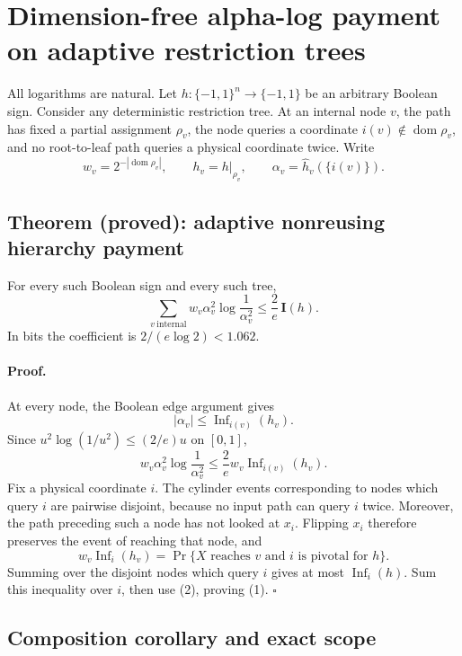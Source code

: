 \section*{Dimension-free alpha-log payment on adaptive restriction trees}

All logarithms are natural.  Let \(h:\{-1,1\}^n\to\{-1,1\}\) be an
arbitrary Boolean sign.  Consider any deterministic restriction tree.
At an internal node \(v\), the path has fixed a partial assignment
\(\rho_v\), the node queries a coordinate \(i(v)\notin\operatorname{dom}\rho_v\),
and no root-to-leaf path queries a physical coordinate twice.  Write
\[
 w_v=2^{-|\operatorname{dom}\rho_v|},\qquad
 h_v=h\vert_{\rho_v},\qquad
 \alpha_v=\widehat h_v(\{i(v)\}).
\]

\subsection*{Theorem (proved): adaptive nonreusing hierarchy payment}

For every such Boolean sign and every such tree,
\[
 \boxed{
 \sum_{v\ \mathrm{internal}}w_v\alpha_v^2
       \log\frac1{\alpha_v^2}
 \le\frac2e\,\mathbf I(h).}                                      \tag{1}
\]
In bits the coefficient is \(2/(e\log2)<1.062\).

\paragraph{Proof.}
At every node, the Boolean edge argument gives
\[
 |\alpha_v|\le\operatorname{Inf}_{i(v)}(h_v).
\]
Since \(u^2\log(1/u^2)\le(2/e)u\) on \([0,1]\),
\[
 w_v\alpha_v^2\log\frac1{\alpha_v^2}
 \le\frac2e w_v\operatorname{Inf}_{i(v)}(h_v).                    \tag{2}
\]
Fix a physical coordinate \(i\).  The cylinder events corresponding to
nodes which query \(i\) are pairwise disjoint, because no input path can
query \(i\) twice.  Moreover, the path preceding such a node has not
looked at \(x_i\).  Flipping \(x_i\) therefore preserves the event of
reaching that node, and
\[
 w_v\operatorname{Inf}_i(h_v)
 =\Pr\{X\text{ reaches }v\text{ and }i\text{ is pivotal for }h\}.
\]
Summing over the disjoint nodes which query \(i\) gives at most
\(\operatorname{Inf}_i(h)\).  Sum this inequality over \(i\), then use
(2), proving (1). \(\square\)

\subsection*{Composition corollary and exact scope}

